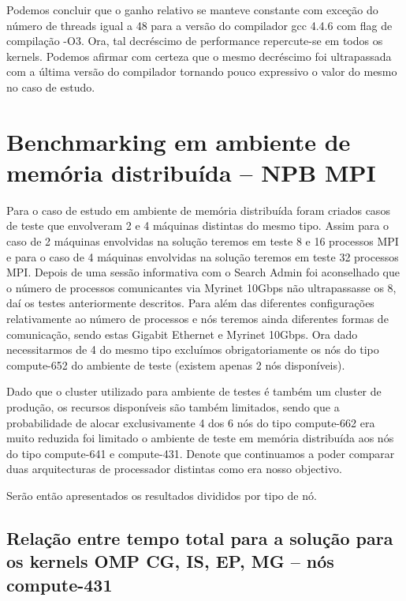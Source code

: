 \documentclass[conference,compsoc]{IEEEtran}
\begin{document}
Podemos concluir que o ganho relativo se manteve constante com exceção do número de threads igual a 48 para a versão do compilador gcc 4.4.6 com flag de compilação -O3. Ora, tal decréscimo de performance repercute-se em todos os kernels. Podemos afirmar com certeza que o mesmo decréscimo foi ultrapassada com a última versão do compilador tornando pouco expressivo o valor do mesmo no caso de estudo.


\section{Benchmarking em ambiente de memória distribuída -- NPB MPI}

Para o caso de estudo em ambiente de memória distribuída foram criados casos de teste que envolveram 2 e 4 máquinas distintas do mesmo tipo. Assim para o caso de 2 máquinas envolvidas na solução teremos em teste 8 e 16 processos MPI e para o caso de 4 máquinas envolvidas na solução teremos em teste 32 processos MPI. Depois de uma sessão informativa com o Search Admin foi aconselhado que o número de processos comunicantes via Myrinet 10Gbps não ultrapassasse os 8, daí os testes anteriormente descritos. Para além das diferentes configurações relativamente ao número de processos e nós teremos ainda diferentes formas de comunicação, sendo estas Gigabit Ethernet e Myrinet 10Gbps. Ora dado necessitarmos de 4 do mesmo tipo excluímos obrigatoriamente os nós do tipo compute-652 do ambiente de teste (existem apenas 2 nós disponíveis). \par 
Dado que o cluster utilizado para ambiente de testes é também um cluster de produção, os recursos disponíveis são também limitados, sendo que a probabilidade de alocar exclusivamente 4 dos 6 nós do tipo compute-662 era muito reduzida foi limitado o ambiente de teste em memória distribuída aos nós do tipo compute-641 e compute-431. Denote que continuamos a poder comparar duas arquitecturas de processador distintas como era nosso objectivo.\par 
Serão então apresentados os resultados divididos por tipo de nó. 


\subsection{Relação entre tempo total para a solução para os kernels OMP CG, IS, EP, MG -- nós compute-431}
\end{document}
